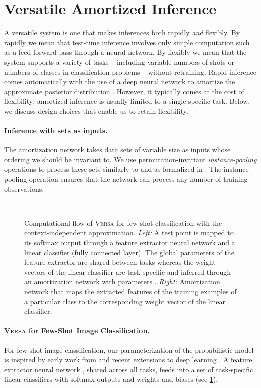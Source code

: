 \documentclass{article}
\newcommand{\Versa}{\textsc{Versa}}
\begin{document}
\section{Versatile Amortized Inference}
\label{sec:amortisation}
A versatile system is one that makes inferences both rapidly \textit{and} flexibly. By rapidly we mean that test-time inference involves only simple computation such as a feed-forward pass through a neural network.  By flexibly we mean that the system supports a variety of tasks -- including variable numbers of shots or numbers of classes in classification problems -- without retraining. Rapid inference comes automatically with the use of a deep neural network to amortize the approximate posterior distribution . However, it typically comes at the cost of flexibility: amortized inference is usually limited to a single specific task. Below, we discuss design choices that enable us to retain flexibility.
\paragraph{Inference with sets as inputs.} The amortization network takes data sets of variable size as inputs whose ordering we should be invariant to. We use permutation-invariant \textit{instance-pooling} operations to process these sets similarly to \citet{qi2017pointnet} and as formalized in \citet{zaheer2017deep}.
The instance-pooling operation ensures that the network can process any number of training observations. \begin{figure}[t]
	\centering
     \\
	\caption{Computational flow of \Versa{} for few-shot classification with the context-independent approximation. \textit{Left:} A test point  is mapped to its softmax output through a feature extractor neural network and a linear classifier (fully connected layer). The global parameters  of the feature extractor are shared between tasks whereas the weight vectors  of the linear classifier are task specific and inferred through an amortization network with parameters . \textit{Right:} Amortization network that maps the extracted features of the  training examples of a particular class to the corresponding weight vector of the linear classifier.}
	\label{fig:approximation_scheme}
\end{figure}


\paragraph{\Versa{} for Few-Shot Image Classification.}
For few-shot image classification, our parameterization of the probabilistic model is inspired by early work from \citet{heskes2000empirical, bakker2003task} and recent extensions to deep learning \citep{bauer2017discriminative, qiao2017few}. A feature extractor neural network , shared across all tasks, feeds into a set of task-specific linear classifiers with softmax outputs and weights and biases  (see \cref{fig:approximation_scheme}).
\end{document}
